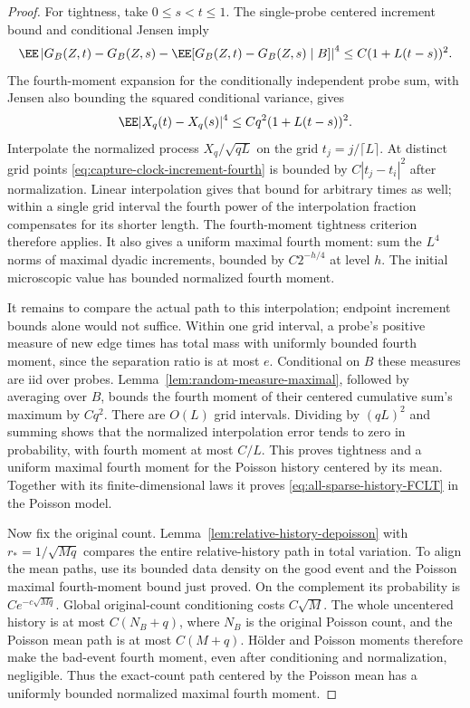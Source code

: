 \documentclass[11pt,letterpaper]{article}
\begin{document}
\begin{proof}
For tightness, take $0\le s<t\le1$. The single-probe centered
increment bound and conditional Jensen imply
\[
 \EE\left|
 G_B(Z,t)-G_B(Z,s)
       -\EE[G_B(Z,t)-G_B(Z,s)\mid B]\right|^4
              \le C(1+L(t-s))^2.
\]
The fourth-moment expansion for the conditionally independent
probe sum, with Jensen also bounding the squared conditional
variance, gives
\begin{equation}\label{eq:capture-clock-increment-fourth}
 \EE|X_q(t)-X_q(s)|^4
             \le Cq^2(1+L(t-s))^2.
\end{equation}
Interpolate the normalized process $X_q/\sqrt{qL}$ on the
grid $t_j=j/\lceil L\rceil$.
At distinct grid points \eqref{eq:capture-clock-increment-fourth}
is bounded by $C|t_j-t_i|^2$ after normalization.
Linear interpolation gives that bound for arbitrary times
as well; within a single grid interval the fourth power of
the interpolation fraction compensates for its shorter length.
The fourth-moment tightness criterion therefore applies.
It also gives a uniform maximal fourth moment: sum the
$L^4$ norms of maximal dyadic increments, bounded by
$C2^{-h/4}$ at level $h$. The initial microscopic value has
bounded normalized fourth moment.

It remains to compare the actual path to this interpolation;
endpoint increment bounds alone would not suffice.
Within one grid interval, a probe's positive measure of
new edge times has total mass with uniformly bounded fourth
moment, since the separation ratio is at most $e$.
Conditional on $B$ these measures are iid over probes.
Lemma~\ref{lem:random-measure-maximal}, followed by averaging
over $B$, bounds the fourth moment of their centered cumulative
sum's maximum by $Cq^2$.
There are $O(L)$ grid intervals. Dividing by $(qL)^2$ and
summing shows that the normalized interpolation error tends
to zero in probability, with fourth moment at most $C/L$.
This proves tightness and a uniform maximal fourth moment
for the Poisson history centered by its mean.
Together with its finite-dimensional laws it proves
\eqref{eq:all-sparse-history-FCLT} in the Poisson model.

Now fix the original count. Lemma~\ref{lem:relative-history-depoisson}
with $r_*=1/\sqrt{Mq}$ compares the entire relative-history
path in total variation. To align the mean paths, use its
bounded data density on the good event and the Poisson
maximal fourth-moment bound just proved.
On the complement its probability is $Ce^{-c\sqrt{Mq}}$.
Global original-count conditioning costs $C\sqrt M$.
The whole uncentered history is at most $C(N_B+q)$, where
$N_B$ is the original Poisson count, and the Poisson mean
path is at most $C(M+q)$.
H\"older and Poisson moments therefore make the bad-event
fourth moment, even after conditioning and normalization,
negligible. Thus the exact-count path centered by the
Poisson mean has a uniformly bounded normalized maximal
fourth moment.


\end{proof}
\end{document}
